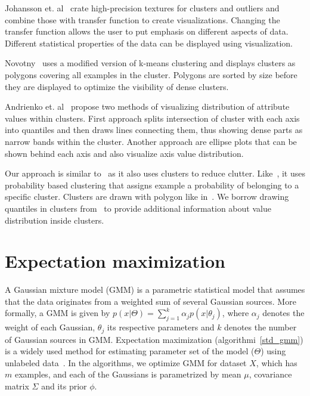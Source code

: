 \documentclass[10pt,a4paper]{article}
\begin{document}
Johansson et. al~\cite{JLJC05} crate high-precision textures for clusters and outliers and combine those with transfer function to create visualizations. Changing the transfer function allows the user to put emphasis on different aspects of data. Different statistical properties of the data can be displayed using visualization.

Novotny~\cite{N04} uses a modified version of k-means clustering and displays clusters as polygons covering all examples in the cluster. Polygons are sorted by size before they are displayed to optimize the visibility of dense clusters.

Andrienko et. al~\cite{AA04} propose two methods of visualizing distribution of attribute values within clusters. First approach splits intersection of cluster with each axis into quantiles and then draws lines connecting them, thus showing dense parts as narrow bands within the cluster. Another approach are ellipse plots that can be shown behind each axis and also visualize axis value distribution.

Our approach is similar to~\cite{FWR99b,JLJC05,N04} as it also uses clusters to reduce clutter. Like~\cite{BH03}, it uses probability based clustering that assigns example a probability of belonging to a specific cluster. Clusters are drawn with polygon like in~\cite{N04,AA04}. We borrow drawing quantiles in clusters from~\cite{AA04} to provide additional information about value distribution inside clusters.

\section{Expectation maximization}
A Gaussian mixture model (GMM) is a parametric statistical model that assumes that the data originates from a weighted sum of several Gaussian sources. More formally, a GMM is given by
$p(x|\Theta) = \sum^k_{j=1}\alpha_jp(x|\theta_j)$, where $\alpha_j$ denotes the weight of each Gaussian, $\theta_j$ its respective parameters and  $k$ denotes the number of Gaussian sources in GMM. Expectation maximization (algorithmi~\ref{std_gmm}) is a widely used method for estimating parameter set of the model ($\Theta$) using unlabeled data~\cite{DLR77}. In the algorithms, we optimize GMM for dataset $X$, which has $m$ examples, and each of the Gaussians is parametrized by mean $\mu$, covariance matrix $\Sigma$ and its prior $\phi$. 
\end{document}
